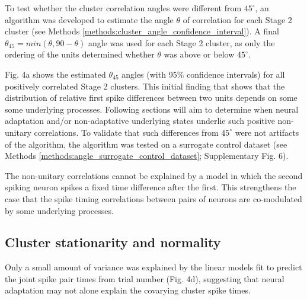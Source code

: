 \documentclass{article}
\begin{document}

To test whether the cluster correlation angles were different from $45^{\circ}$, an algorithm was developed to estimate the angle $\theta$ of correlation for each Stage 2 cluster (see Methods \ref{methods:cluster_angle_confidence_interval}). A final $\theta_{45} = min(\theta, 90-\theta)$ angle was used for each Stage 2 cluster, as only the ordering of the units determined whether $\theta$ was above or below $45^{\circ}$.

Fig. 4a shows the estimated $\theta_{45}$ angles (with 95\% confidence intervals) for all positively correlated Stage 2 clusters.
This initial finding that shows that the distribution of relative first spike differences between two units depends on some some underlying processes.
Following sections will aim to determine when neural adaptation and/or non-adaptative underlying states underlie such positive non-unitary correlations. 
To validate that such differences from $45^{\circ}$ were not artifacts of the algorithm, the algorithm was tested on a surrogate control dataset (see Methods \ref{methods:angle_surrogate_control_dataset}; Supplementary Fig. 6). 

The non-unitary correlations cannot be explained by a model in which the second spiking neuron spikes a fixed time difference after the first. 
This strengthens the case that the spike timing correlations between pairs of neurons are co-modulated by some underlying processes. 




\subsection*{Cluster stationarity and normality}

Only a small amount of variance was explained by the linear models fit to predict the joint spike pair times from trial number (Fig. 4d), suggesting that neural adaptation may not alone explain the covarying cluster spike times. 
\end{document}
